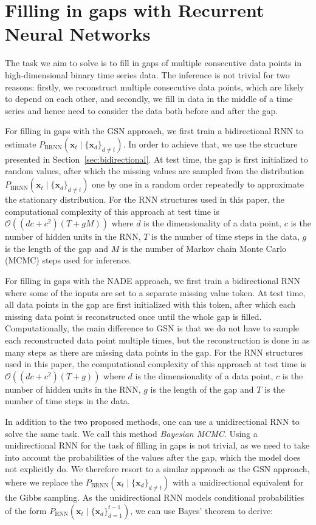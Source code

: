 \documentclass{article}
\begin{document}
\section{Filling in gaps with Recurrent Neural Networks}

The task we aim to solve is to fill in gaps of multiple consecutive data points 
in high-dimensional binary time series data. The inference is not trivial for 
two reasons: firstly, we reconstruct multiple consecutive data points, which are likely 
to depend on each other, and secondly, we fill in data in the middle of a time 
series and hence need to consider the data both before and after the gap.

For filling in gaps with the GSN approach, we first train a bidirectional RNN 
to estimate $P_{\mathrm{BRNN}}(\mathbf{x}_{t} \mid \{\mathbf{x}_d\}_{d\neq t})$. In order to 
achieve that, we use the structure presented in Section~\ref{sec:bidirectional}. 
At test time, the gap is first initialized to random values, after which the 
missing values are sampled from the distribution $P_{\mathrm{BRNN}}(\mathbf{x}_{t} \mid 
\{\mathbf{x}_d\}_{d\neq t})$ one by one in a random order repeatedly to approximate the stationary distribution. For 
the RNN structures used in this paper, the computational complexity of this 
approach at test time is $\mathcal{O}((dc+c^2)(T+gM))$ where $d$ is the 
dimensionality of a data point, $c$ is the number of hidden units in the RNN, 
$T$ is the number of time steps in the data, $g$ is the length of the gap and 
$M$ is the number of Markov chain Monte Carlo (MCMC) steps used for inference.

For filling in gaps with the NADE approach, we first train a bidirectional RNN 
where some of the inputs are set to a separate missing value token. At test 
time, all data points in the gap are first initialized with this token, after 
which each missing data point is reconstructed once until the whole gap is 
filled. Computationally, the main difference to GSN is that we do not have to 
sample each reconstructed data point multiple times, but the reconstruction is done in as many 
steps as there are missing data points in the gap. For the RNN structures used 
in this paper, the computational complexity of this approach at test time is 
$\mathcal{O}((dc+c^2)(T+g))$ where $d$ is the dimensionality of a data point, 
$c$ is the number of hidden units in the RNN, $g$ is the length of the gap and 
$T$ is the number of time steps in the data.

In addition to the two proposed methods, one can use a unidirectional RNN to 
solve the same task. We call this method \emph{Bayesian MCMC}. Using a 
unidirectional RNN for the task of filling in gaps is not trivial, as we need to take into account 
the probabilities of the values after the gap, which the model does not 
explicitly do. We therefore resort to a similar approach as the GSN approach, 
where we replace the $P_{\mathrm{BRNN}}(\mathbf{x}_{t} \mid \{\mathbf{x}_d\}_{d\neq t})$ with a 
unidirectional equivalent for the Gibbs sampling. As the unidirectional RNN 
models conditional probabilities of the form $P_{\mathrm{RNN}}(\mathbf{x}_t \mid 
\{\mathbf{x}_d\}_{d=1}^{t-1})$, we can use Bayes' theorem to derive:
\end{document}
